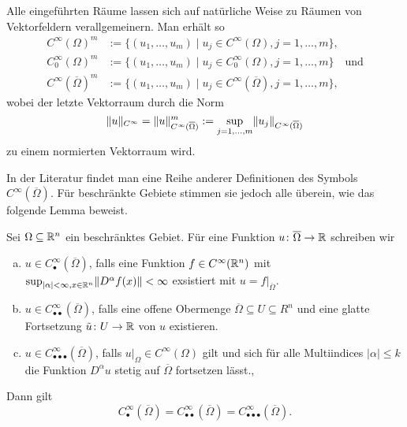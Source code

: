 Alle eingeführten Räume lassen sich auf natürliche Weise zu Räumen von Vektor\-feldern verallgemeinern.
Man erhält so
\begin{align*}
  C^\infty(\Omega)^m &:= \{(u_1,\dots,u_m) \mid u_j \in C^\infty(\Omega), j = 1,\dots,m\}, \\
  C_0^\infty(\Omega)^m &:= \{(u_1,\dots,u_m) \mid u_j \in C_0^\infty(\Omega), j = 1,\dots,m\} \quad\text{und} \\
  C^\infty(\overline\Omega)^m &:= \{(u_1,\dots,u_m) \mid u_j \in C^\infty(\overline\Omega), j = 1,\dots,m\},
\end{align*}
wobei der letzte Vektorraum durch die Norm
$$
\lVert u \rVert_{C^\infty} = \lVert u \rVert_{C^\infty(\overline\Omega)}^m := \sup_{j = 1,\dots, m} \lVert u_j \rVert_{C^\infty(\overline\Omega)}
$$
zu einem normierten Vektorraum wird.

In der Literatur findet man eine Reihe anderer Definitionen des Symbols $C^\infty(\overline\Omega)$.
Für beschränkte Gebiete stimmen sie jedoch alle überein, wie das folgende Lemma beweist.

\begin{lem}
  \label{lem:CInftyClosedOmega}
  Sei $\Omega \subseteq \mathbb{R}^n$ ein beschränktes Gebiet.
  Für eine Funktion $u \colon \overline\Omega \to \mathbb{R}$ schreiben wir
  \begin{enumerate}[(a)]
    \item $u \in C^\infty_\bullet(\overline\Omega)$,
      falls eine Funktion $f \in C^\infty(\mathbb{R}^n)$ mit $\sup_{|\alpha| < \infty, x \in \mathbb{R}^n} \lVert D^\alpha f(x) \rVert <  \infty$ exsistiert mit $u = f|_{\overline\Omega}$.\cite[S.23, I.3.1]{sohr2001navier}

    \item $u \in C^\infty_{\bullet\bullet}(\overline\Omega)$,
      falls eine offene Obermenge $\overline\Omega \subseteq U \subseteq R^n$ und eine glatte Fortsetzung $\tilde u \colon U \to \mathbb{R}$ von $u$ existieren.

    \item $ u \in C^\infty_{\bullet\bullet\bullet}(\overline\Omega)$,
    falls $u|_\Omega \in C^\infty(\Omega)$ gilt und sich für alle Multiindices $|\alpha|\leq k$ die Funktion $D^\alpha u$ stetig auf $\overline\Omega$ fortsetzen lässt.\cite[S.10, 1.28]{adams2003sobolev},\cite[S.35, II.1.3]{galdi2011navier}
   
  \end{enumerate}

  Dann gilt
  $$
    C^\infty_{\bullet}(\overline\Omega) =
    C^\infty_{\bullet\bullet}(\overline\Omega) =
    C^\infty_{\bullet\bullet\bullet}(\overline\Omega).
  $$
\end{lem}

